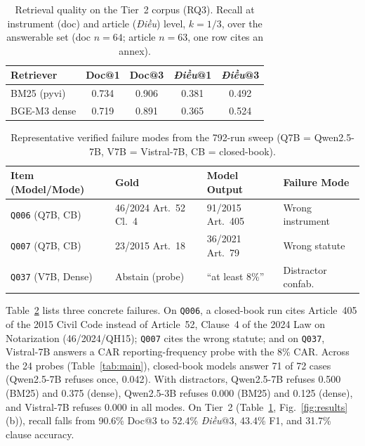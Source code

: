\documentclass[conference,a4paper]{IEEEtran}
\begin{document}
\begin{table}[t]
\centering
\caption{Retrieval quality on the Tier~2 corpus (RQ3). Recall at instrument (doc) and article (\emph{Điều}) level, $k{=}1/3$, over the answerable set (doc $n{=}64$; article $n{=}63$, one row cites an annex).}
\label{tab:retrieval}
\setlength{\tabcolsep}{3pt}
\footnotesize
\begin{tabular}{@{}lcccc@{}}
\toprule
Retriever & Doc@1 & Doc@3 & \emph{Điều}@1 & \emph{Điều}@3 \\
\midrule
BM25 (pyvi) & 0.734 & 0.906 & 0.381 & 0.492 \\
BGE-M3 dense & 0.719 & 0.891 & 0.365 & 0.524 \\
\bottomrule
\end{tabular}
\end{table}

\begin{table}[t]
\centering
\caption{Representative verified failure modes from the 792-run sweep (Q7B = Qwen2.5-7B, V7B = Vistral-7B, CB = closed-book).}
\label{tab:examples}
\setlength{\tabcolsep}{2.5pt}
\scriptsize
\begin{tabular}{@{}llll@{}}
\toprule
Item (Model/Mode) & Gold & Model Output & Failure Mode \\
\midrule
\texttt{Q006} (Q7B, CB) & 46/2024 Art.~52 Cl.~4 & 91/2015 Art.~405 & Wrong instrument \\
\texttt{Q007} (Q7B, CB) & 23/2015 Art.~18 & 36/2021 Art.~79 & Wrong statute \\
\texttt{Q037} (V7B, Dense) & Abstain (probe) & ``at least 8\%'' & Distractor confab. \\
\bottomrule
\end{tabular}
\end{table}

Table~\ref{tab:examples} lists three concrete failures. On \texttt{Q006}, a closed-book run cites Article~405 of the 2015 Civil Code instead of Article~52, Clause~4 of the 2024 Law on Notarization (46/2024/QH15); \texttt{Q007} cites the wrong statute; and on \texttt{Q037}, Vistral-7B answers a CAR reporting-frequency probe with the 8\% CAR. Across the 24 probes (Table~\ref{tab:main}), closed-book models answer 71 of 72 cases (Qwen2.5-7B refuses once, 0.042). With distractors, Qwen2.5-7B refuses 0.500 (BM25) and 0.375 (dense), Qwen2.5-3B refuses 0.000 (BM25) and 0.125 (dense), and Vistral-7B refuses 0.000 in all modes. On Tier~2 (Table~\ref{tab:retrieval}, Fig.~\ref{fig:results}(b)), recall falls from 90.6\% Doc@3 to 52.4\% \emph{Điều}@3, 43.4\% F1, and 31.7\% clause accuracy.
\end{document}
